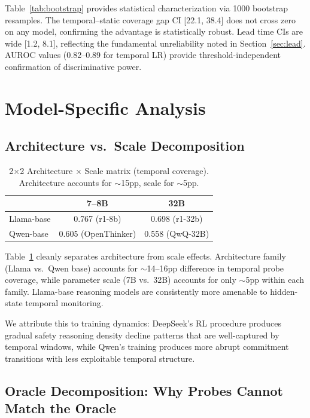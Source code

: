 \documentclass[11pt,a4paper]{article}
\begin{document}
Table~\ref{tab:bootstrap} provides statistical characterization via 1000 bootstrap resamples. The temporal--static coverage gap CI [22.1, 38.4] does not cross zero on any model, confirming the advantage is statistically robust. Lead time CIs are wide [1.2, 8.1], reflecting the fundamental unreliability noted in Section~\ref{sec:lead}. AUROC values (0.82--0.89 for temporal LR) provide threshold-independent confirmation of discriminative power.

\section{Model-Specific Analysis}

\subsection{Architecture vs.\ Scale Decomposition}

\begin{table}[t]
\centering
\small
\begin{tabular}{lcc}
\toprule
& 7--8B & 32B \\
\midrule
Llama-base & 0.767 (r1-8b) & 0.698 (r1-32b) \\
Qwen-base & 0.605 (OpenThinker) & 0.558 (QwQ-32B) \\
\bottomrule
\end{tabular}
\caption{2$\times$2 Architecture $\times$ Scale matrix (temporal coverage). Architecture accounts for $\sim$15pp, scale for $\sim$5pp.}
\label{tab:2x2}
\end{table}

Table~\ref{tab:2x2} cleanly separates architecture from scale effects. Architecture family (Llama vs.\ Qwen base) accounts for $\sim$14--16pp difference in temporal probe coverage, while parameter scale (7B vs.\ 32B) accounts for only $\sim$5pp within each family. Llama-base reasoning models are consistently more amenable to hidden-state temporal monitoring.

We attribute this to training dynamics: DeepSeek's RL procedure produces gradual safety reasoning density decline patterns that are well-captured by temporal windows, while Qwen's training produces more abrupt commitment transitions with less exploitable temporal structure.

\subsection{Oracle Decomposition: Why Probes Cannot Match the Oracle}
\end{document}

